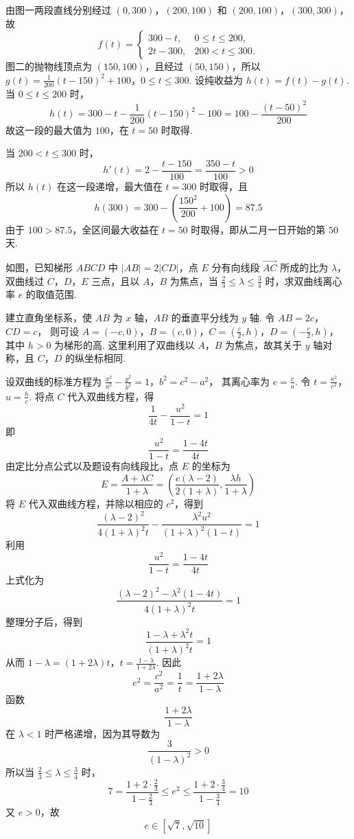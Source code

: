 \begin{solution}
由图一两段直线分别经过 \((0,300)\)，\((200,100)\) 和 \((200,100)\)，\((300,300)\)，故
\[
f(t)=
\begin{cases}
300-t,&0\leqslant t\leqslant200,\\
2t-300,&200<t\leqslant300.
\end{cases}
\]
图二的抛物线顶点为 \((150,100)\)，且经过 \((50,150)\)，所以
\(g(t)=\frac1{200}(t-150)^2+100\)，\(0\leqslant t\leqslant300\).
设纯收益为 \(h(t)=f(t)-g(t)\). 当 \(0\leqslant t\leqslant200\) 时，
\[
h(t)=300-t-\frac1{200}(t-150)^2-100
=100-\frac{(t-50)^2}{200}
\]
故这一段的最大值为 \(100\)，在 \(t=50\) 时取得.

当 \(200<t\leqslant300\) 时，
\[
h'(t)=2-\frac{t-150}{100}=\frac{350-t}{100}>0
\]
所以 \(h(t)\) 在这一段递增，最大值在 \(t=300\) 时取得，且
\[
h(300)=300-\left(\frac{150^2}{200}+100\right)=87.5
\]
由于 \(100>87.5\)，全区间最大收益在 \(t=50\) 时取得，即从二月一日开始的第 \(50\) 天.
\end{solution}

\begin{problem}
如图，已知梯形 \(ABCD\) 中 \(|AB| = 2|CD|\)，点 \(E\) 分有向线段 \(\overrightarrow{AC}\) 所成的比为 \(\lambda\)，双曲线过 \(C\)，\(D\)，\(E\) 三点，且以 \(A\)，\(B\) 为焦点，当 \(\frac{2}{3} \leqslant \lambda \leqslant \frac{3}{4}\) 时，求双曲线离心率 \(e\) 的取值范围.
\end{problem}

\begin{solution}
建立直角坐标系，使 \(AB\) 为 \(x\) 轴，\(AB\) 的垂直平分线为 \(y\) 轴. 令
\(AB=2c\)，\(CD=c\)，
则可设
\(A=(-c,0)\)，\(B=(c,0)\)，\(C=\left(\frac c2,h\right)\)，\(D=\left(-\frac c2,h\right)\)，
其中 \(h>0\) 为梯形的高. 这里利用了双曲线以 \(A\)，\(B\) 为焦点，故其关于 \(y\) 轴对称，且 \(C\)，\(D\) 的纵坐标相同.

设双曲线的标准方程为
\(\frac{x^2}{a^2}-\frac{y^2}{b^2}=1\)，\(b^2=c^2-a^2\)，
其离心率为 \(e=\frac{c}{a}\). 令
\(t=\frac{a^2}{c^2}\)，\(u=\frac hc\).
将点 \(C\) 代入双曲线方程，得
\[
\frac{1}{4t}-\frac{u^2}{1-t}=1
\]
即
\[
\frac{u^2}{1-t}=\frac{1-4t}{4t}
\]
由定比分点公式以及题设有向线段比，点 \(E\) 的坐标为
\[
E=\frac{A+\lambda C}{1+\lambda}
=\left(\frac{c(\lambda-2)}{2(1+\lambda)},
\frac{\lambda h}{1+\lambda}\right)
\]
将 \(E\) 代入双曲线方程，并除以相应的 \(c^2\)，得到
\[
\frac{(\lambda-2)^2}{4(1+\lambda)^2t}
-\frac{\lambda^2u^2}{(1+\lambda)^2(1-t)}=1
\]
利用
\[
\frac{u^2}{1-t}=\frac{1-4t}{4t}
\]
上式化为
\[
\frac{(\lambda-2)^2-\lambda^2(1-4t)}
{4(1+\lambda)^2t}=1
\]
整理分子后，得到
\[
\frac{1-\lambda+\lambda^2t}{(1+\lambda)^2t}=1
\]
从而
\(1-\lambda=(1+2\lambda)t\)，\(t=\frac{1-\lambda}{1+2\lambda}\).
因此
\[
e^2=\frac{c^2}{a^2}
=\frac1t
=\frac{1+2\lambda}{1-\lambda}
\]
函数
\[
\frac{1+2\lambda}{1-\lambda}
\]
在 \(\lambda<1\) 时严格递增，因为其导数为
\[
\frac{3}{(1-\lambda)^2}>0
\]
所以当 \(\frac23\leqslant\lambda\leqslant\frac34\) 时，
\[
7=\frac{1+2\cdot\frac23}{1-\frac23}
\leqslant e^2
\leqslant
\frac{1+2\cdot\frac34}{1-\frac34}=10
\]
又 \(e>0\)，故
\[
e\in\left[\sqrt7,\sqrt{10}\right]
\]
\end{solution}
